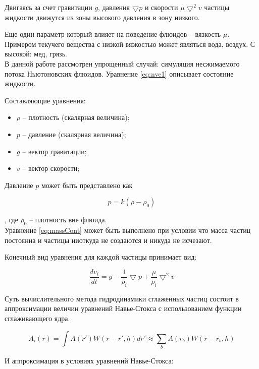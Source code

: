 Двигаясь за счет гравитации $g$, давления $\bigtriangledown{}p$ и скорости $\mu\bigtriangledown^2v$ частицы жидкости движутся из зоны высокого давления в зону низкого.

Еще один параметр который влияет на поведение флюидов -- вязкость $\mu$.
Примером текучего вещества с низкой вязкостью может являться вода, воздух.
С высокой: мед, грязь. \\

В данной работе рассмотрен упрощенный случай: симуляция несжимаемого потока
Ньютоновских флюидов. Уравнение \eqref{eq:nve1} описывает состояние жидкости.

Составляющие уравнения:

\begin{itemize}
  \item $\rho$ -- плотность (скалярная величина);
  \item $p$ -- давление (скалярная величина);
  \item $g$ -- вектор гравитации;
  \item $v$ -- вектор скорости;
\end{itemize}

Давление $p$ может быть представлено как

\begin{equation}
\label{eq:pressure}
  p = k(\rho - \rho_0)
\end{equation}

, где $\rho_0$ -- плотность вне флюида. \\

Уравнение \eqref{eq:massCont} может быть выполнено при условии что масса частиц
постоянна и частицы ниоткуда не создаются и никуда не исчезают.

Конечный вид уравнения для каждой частицы принимает вид:

\begin{equation}
\label{eq:}
\frac{dv_i}{dt} = g - \frac{1}{\rho_i}\bigtriangledown{}p + \frac{\mu}{\rho_i}\bigtriangledown^2v
\end{equation}

Суть вычислительного метода гидродинамики сглаженных частиц состоит в аппроксимации величин
уравнений Навье-Стокса с использованием функции сглаживающего ядра.

\begin{equation}
\label{eq:mon1992}
A_i(r) = \int{}A(r')W(r - r', h)dr' \approx \sum_{b}A(r_b)W(r - r_b, h)
\end{equation}

И аппроксимация в условиях уравнений Навье-Стокса:


